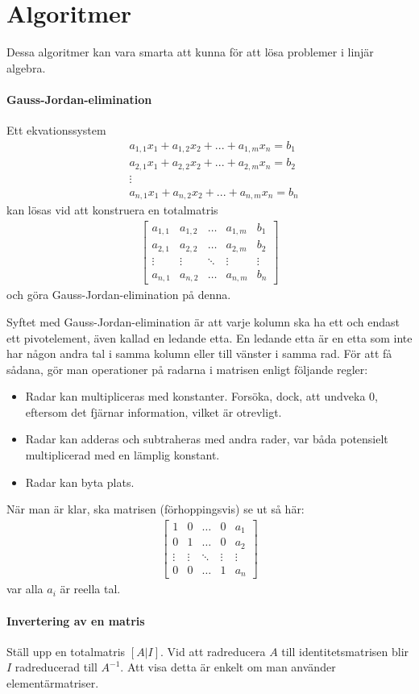 \twocolumn

\section{Algoritmer}
Dessa algoritmer kan vara smarta att kunna för att lösa problemer i linjär algebra.

\paragraph{Gauss-Jordan-elimination}

Ett ekvationssystem
\begin{align*}
	& a_{1,1}x_1 + a_{1,2}x_2 + ... + a_{1,m}x_n = b_1 \\
	& a_{2,1}x_1 + a_{2,2}x_2 + ... + a_{2,m}x_n = b_2 \\
	& \vdots \\
	& a_{n,1}x_1 + a_{n,2}x_2 + ... + a_{n,m}x_n = b_n
\end{align*}
kan lösas vid att konstruera en totalmatris
\begin{align*}
	\left[\begin{array}{cccc|c}
    	a_{1,1} & a_{1,2} & \dots  & a_{1,m} & b_1 \\
    	a_{2,1} & a_{2,2} & \dots  & a_{2,m} & b_2 \\
    	\vdots  & \vdots  & \ddots & \vdots  & \vdots \\
	    a_{n,1} & a_{n,2} & \dots  & a_{n,m} & b_n
	\end{array}\right]
\end{align*}
och göra Gauss-Jordan-elimination på denna.

Syftet med Gauss-Jordan-elimination är att varje kolumn ska ha ett och endast ett pivotelement, även kallad en ledande etta. En ledande etta är en etta som inte har någon andra tal i samma kolumn eller till vänster i samma rad. För att få sådana, gör man operationer på radarna i matrisen enligt följande regler:
\begin{itemize}
	\item Radar kan multipliceras med konstanter. Forsöka, dock, att undveka $0$, eftersom det fjärnar information, vilket är otrevligt.
	\item Radar kan adderas och subtraheras med andra rader, var båda  potensielt multiplicerad med en lämplig konstant.
	\item Radar kan byta plats.
\end{itemize}

När man är klar, ska matrisen (förhoppingsvis) se ut så här:
\begin{align*}
	\left[\begin{array}{cccc|c}
    	1      & 0      & \dots  & 0      & a_1 \\
    	0      & 1      & \dots  & 0      & a_2 \\
    	\vdots & \vdots & \ddots & \vdots & \vdots \\
	    0      & 0      & \dots  & 1      & a_n
	\end{array}\right]
\end{align*}
var alla $a_i$ är reella tal.

\paragraph{Invertering av en matris}
Ställ upp en totalmatris $[A | I]$. Vid att radreducera $A$ till identitetsmatrisen blir $I$ radreducerad till $A^{-1}$. Att visa detta är enkelt om man använder elementärmatriser.